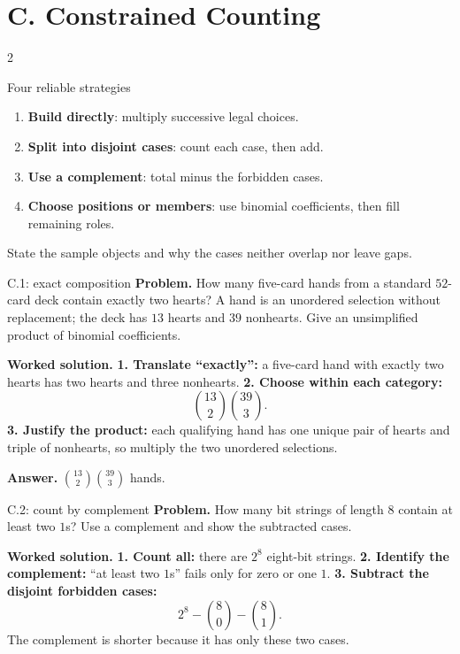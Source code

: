 \documentclass[10pt]{article}
\newcommand{\term}[1]{\textbf{\color{CoreNavy}#1}}
\begin{document}
\section*{C. Constrained Counting}
\begin{multicols}{2}
\begin{methodbox}{Four reliable strategies}
\begin{enumerate}
  \item \term{Build directly}: multiply successive legal choices.
  \item \term{Split into disjoint cases}: count each case, then add.
  \item \term{Use a complement}: total minus the forbidden cases.
  \item \term{Choose positions or members}: use binomial coefficients, then
  fill remaining roles.
\end{enumerate}
State the sample objects and why the cases neither overlap nor leave gaps.
\end{methodbox}

\begin{workedbox}{C.1: exact composition}
\textbf{Problem.} How many five-card hands from a standard $52$-card deck contain exactly two hearts? A hand is an unordered selection without replacement; the deck has $13$ hearts and $39$ nonhearts. Give an unsimplified product of binomial coefficients.

\textbf{Worked solution.} \textbf{1. Translate ``exactly'':} a five-card hand with exactly two hearts has
two hearts and three nonhearts. \textbf{2. Choose within each category:}
\[
\binom{13}{2}\binom{39}{3}.
\]
\textbf{3. Justify the product:} each qualifying hand has one unique pair of
hearts and triple of nonhearts, so multiply the two unordered selections.

\textbf{Answer.} $\binom{13}{2}\binom{39}{3}$ hands.
\end{workedbox}

\begin{workedbox}{C.2: count by complement}
\textbf{Problem.} How many bit strings of length $8$ contain at least two $1$s? Use a complement and show the subtracted cases.

\textbf{Worked solution.} \textbf{1. Count all:} there are $2^8$ eight-bit strings.
\textbf{2. Identify the complement:} ``at least two $1$s'' fails only for zero
or one $1$. \textbf{3. Subtract the disjoint forbidden cases:}
\[
2^8-\binom80-\binom81.
\]
The complement is shorter because it has only these two cases.


\end{workedbox}
\end{multicols}
\end{document}
